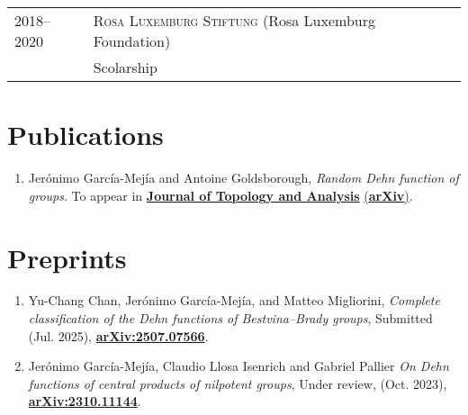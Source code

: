 \documentclass[a4paper,11pt]{article} %
\begin{document}
\begin{longtable}{>{\raggedleft\arraybackslash}p{4cm}p{10cm}}

\textsc{2018--2020} & \textsc{Rosa Luxemburg Stiftung} \small (Rosa Luxemburg Foundation)\vspace{0.2em}\\
& Scolarship
\end{longtable}


\section{Publications}

\begin{minipage}{15cm}
\begin{enumerate}[align=right, itemsep=.5em, leftmargin=1.8em]
	
	\item Jerónimo García-Mejía and Antoine Goldsborough, \emph{Random Dehn function of groups}. To appear in {\href{https://doi.org/10.1142/S179352532550027X}{\textbf{Journal of Topology and Analysis}}} {\href{https://arxiv.org/abs/2411.12715}{(\textbf{arXiv})}}.
    
\end{enumerate}
\end{minipage}

\section{Preprints}

\begin{minipage}{15cm}
\begin{enumerate}[align=right, itemsep=.5em, leftmargin=1.8em]
	
	\item Yu-Chang Chan, Jerónimo García-Mejía, and Matteo Migliorini, \emph{Complete classification of the Dehn functions of Bestvina--Brady groups}, Submitted (Jul. 2025), {\href{https://arxiv.org/abs/2507.07566}{\textbf{arXiv:2507.07566}}}.
    
    \item Jerónimo García-Mejía, Claudio Llosa Isenrich and Gabriel Pallier \emph{On Dehn functions of central products of nilpotent groups}, Under review,  (Oct. 2023), {\href{https://arxiv.org/abs/2310.11144}{\textbf{arXiv:2310.11144}}}.
    
\end{enumerate}
\end{minipage}
\end{document}

